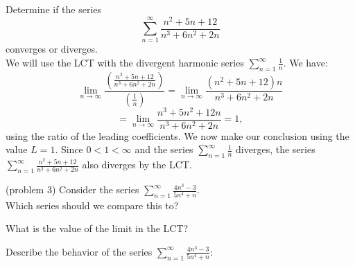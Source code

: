 \documentclass{ximera}
\begin{document}
\begin{example}[example 3]
Determine if the series 
\[
\sum_{n=1}^\infty \frac{n^2 + 5n + 12}{n^3 + 6n^2 + 2n}
\]
converges or diverges.\\
We will use the LCT with the divergent harmonic series $\displaystyle{\sum_{n=1}^\infty \frac{1}{n}}$. We have:
\[
\lim_{n \to \infty} \frac{\left(\frac{n^2 + 5n + 12}{n^3 + 6n^2 + 2n}\right)}{\left(\frac{1}{n}\right)} = \lim_{n \to \infty} \frac{(n^2 + 5n + 12)n}{n^3 + 6n^2 + 2n}
\]
\[
= \lim_{n \to \infty} \frac{n^3 + 5n^2 + 12n}{n^3 + 6n^2 + 2n} = 1,
\]
using the ratio of the leading coefficients. We now make our conclusion using the value $L = 1$. Since $0 < 1 < \infty$ and the series $\displaystyle{\sum_{n=1}^\infty \frac{1}{n}}$
diverges, the series $\displaystyle{\sum_{n=1}^\infty \frac{n^2 + 5n + 12}{n^3 + 6n^2 + 2n}}$ also diverges by the LCT.
\end{example}




\begin{problem}(problem 3)
Consider the series $\displaystyle{\sum_{n=1}^\infty \frac{4n^3 -3}{5n^4 + n}}$.\\
Which series should we compare this to?

\begin{multipleChoice}
\end{multipleChoice}

What is the value of the limit in the LCT?
\begin{multipleChoice}
\end{multipleChoice}

Describe the behavior of the series $\displaystyle{\sum_{n=1}^\infty \frac{4n^3 -3}{5n^4 +n}:}$
\begin{multipleChoice}
\end{multipleChoice}

\end{problem}
\end{document}
